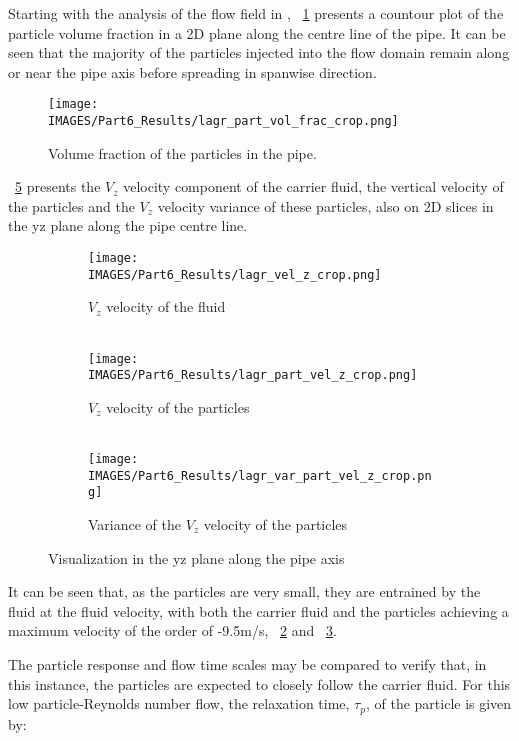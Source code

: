 Starting with the analysis of the flow field in \paravis, \figurename~\ref{lag:part_vol_frac} presents a countour plot of the particle volume fraction in a 2D plane along the centre line of the pipe.  It can be seen that the majority of the particles injected into the flow domain remain along or near the pipe axis before spreading in spanwise direction.
%
\begin{figure}[H]
\centering
\texttt{[image: \\IMAGES/Part6\_Results/lagr\_part\_vol\_frac\_crop.png]}
\caption{Volume fraction of the particles in the pipe.}\label{lag:part_vol_frac}
\end{figure}
%
\figurename~\ref{lag:v_z} presents the $V_z$ velocity component of the carrier fluid, the vertical velocity of the particles and the $V_z$ velocity variance of these particles, also on 2D slices in the yz plane along the pipe centre line.
%
\begin{figure}[H]
\begin{subfigure}{0.3\textwidth}
\centering
\texttt{[image: \\IMAGES/Part6\_Results/lagr\_vel\_z\_crop.png]}
\caption{$V_z$ velocity of the fluid\\ \ \ }
\label{lag:cap1_vel}
\end{subfigure}
\begin{subfigure}{0.3\textwidth}
\centering
\texttt{[image: \\IMAGES/Part6\_Results/lagr\_part\_vel\_z\_crop.png]}
\caption{$V_z$ velocity of the particles\\ \ \ }
\label{lag:cap2_vel}
\end{subfigure}
\begin{subfigure}{0.3\textwidth}
\centering
\texttt{[image: \\IMAGES/Part6\_Results/lagr\_var\_part\_vel\_z\_crop.png]}
\caption{Variance of the $V_z$ velocity of the particles}
\label{lag:cap3_vel}
\end{subfigure}
\caption{Visualization in the yz plane along the pipe axis}
\label{lag:v_z}
\end{figure}
%
It can be seen that, as the particles are very small, they are entrained by the fluid at the fluid velocity, with both the carrier fluid and the particles achieving a maximum velocity of the order of -9.5m/s, \figurename~\ref{lag:cap1_vel} and \figurename~\ref{lag:cap2_vel}.

The particle response and flow time scales may be compared to verify that, in this instance, the particles are expected to closely follow the carrier fluid.   For this low particle-Reynolds number flow, the relaxation time, $\tau_p$, of the particle is given by:

